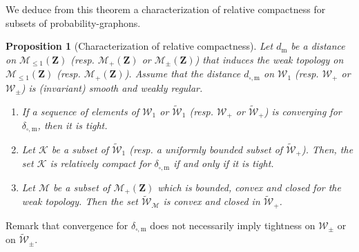 \documentclass{amsart}
\theoremstyle{plain}
\newtheorem{prop}[Th]{Proposition}
\theoremstyle{definition}
\newcommand{\Space}{\mathbf{Z}}
\newcommand{\signed}{\pm}
\newcommand{\ck}{\mathcal{K}}
\newcommand{\cm}{\mathcal{M}}
\newcommand{\cW}{\mathcal{W}}
\newcommand{\SubProba}{\mathcal{M}_{\leq1}(\Space)}
\newcommand{\Meas}{\mathcal{M}_+(\Space)}
\newcommand{\SignedMeas}{\mathcal{M}_{\pm}(\Space)}
\newcommand{\Graphon}{\mathcal{W}_1}
\newcommand{\Kernel}{\mathcal{W}_{\signed}}
\newcommand{\Kernelp}{\mathcal{W}_{+}}
\newcommand{\UGraphon}{\widetilde{\mathcal{W}}_1}
\newcommand{\UKernel}{\widetilde{\mathcal{W}}_{\signed}}
\newcommand{\UKernelp}{\widetilde{\mathcal{W}}_{+}}
\newcommand{\m}{\mathrm{m}}
\newcommand{\dmeas}{d_\m}
\newcommand{\dcut}{d_{\square,\m}}
\newcommand{\ddcut}{\delta_{\square,\m}}
\begin{document}
We deduce from this theorem a characterization of relative compactness
for subsets of probability-graphons.

\begin{prop}[Characterization of relative compactness]\label{prop_equiv_tight_compact}
  Let  $\dmeas$  be   a  distance  on  $\SubProba$   (resp.  $\Meas$  or
  $\SignedMeas$) that  induces the weak topology on  $\SubProba$ (resp.
  $\Meas$).   Assume   that   the   distance   $\dcut$   on   $\Graphon$
  (resp.  $\Kernelp$  or $\Kernel$)  is  (invariant)  smooth and  weakly
  regular.

    \begin{enumerate}[label=(\roman*)]
    \item\label{it:cv-tight-recip}
If a sequence of elements of
    $\Graphon$ or $\UGraphon$ (resp. $\Kernelp$ or $\UKernelp$) is
    converging for $\ddcut$, then it is tight.
    \item     \label{it:compact}
  Let $\ck$ be a subset of $\UGraphon$ (resp. a uniformly bounded
  subset of $\UKernelp$).  Then, the set $\ck$ is relatively compact for
  $\ddcut$ if and only if it is tight.
\item \label{it:cvx-closed}  Let $\cm$ be  a subset of $\Meas$  which is
   bounded, convex   and   closed   for   the  weak   topology.   
  Then   the   set
  $\widetilde{\cW} _\cm$ is convex and closed in $\UKernelp$.
 \end{enumerate}
\end{prop}

Remark that convergence for $\ddcut$ does not necessarily imply tightness on $\Kernel$ or on $\UKernel$.
\end{document}
